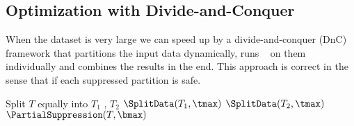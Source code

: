 %
%
%

\subsection{Optimization with Divide-and-Conquer}
\label{algo:impmentation}

When the dataset is very large we can speed up by
a divide-and-conquer (DnC) framework that
partitions the input data dynamically,
runs \PartialSuppression~
on them individually and combines the results in the end. This approach is
correct in the sense that if each suppressed partition is safe. 

\begin{algorithm2e}
\caption{$\SplitData(T,\tmax)$} \label{algo:splitdata}
\begin{algorithmic}[1]
        \STATE Split $T$ equally into $T_1$ , $T_2$
        \STATE $\SplitData(T_1,  \tmax)$
        \STATE $\SplitData(T_2, \tmax)$
    \ELSE
        \STATE $\PartialSuppression(T,  \bmax)$
    \ENDIF
\end{algorithmic}
\end{algorithm2e}

